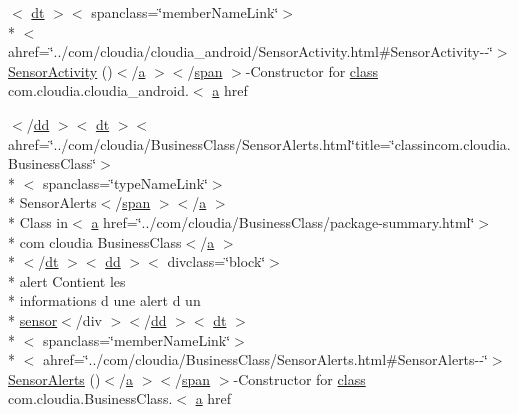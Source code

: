 \begin{DoxyCompactItemize}
$<$ \hyperlink{stylesheet_8css_a107565fb4039d33b041380d6e0ea1d80}{dt} $>$$<$ spanclass=\char`\"{}member\-Name\-Link\char`\"{}$>$\\*
$<$ ahref=\char`\"{}../com/cloudia/cloudia\-\_\-android/Sensor\-Activity.\-html\#Sensor\-Activity-\/-\/\char`\"{}$>$ \hyperlink{index-17_8html_a97696518ed3fb5905076e7d8a3e64b5a}{Sensor\-Activity} ()$<$/\hyperlink{style_8css_a5e8981582017bb8b84c21f148345d1f7}{a} $>$$<$/\hyperlink{stylesheet_8css_a8343996ebcf16220b04e54659aac31cc}{span} $>$-\/Constructor for \hyperlink{_tools_8html_acf06f836132665ba8114f5a414c2403f}{class} com.\-cloudia.\-cloudia\-\_\-android.$<$ \hyperlink{style_8css_a5e8981582017bb8b84c21f148345d1f7}{a} href
\item 
$<$/\hyperlink{stylesheet_8css_a47f4718a86835a7771ec592ece845221}{dd} $>$$<$ \hyperlink{stylesheet_8css_a107565fb4039d33b041380d6e0ea1d80}{dt} $>$$<$ ahref=\char`\"{}../com/cloudia/Business\-Class/Sensor\-Alerts.\-html\char`\"{}title=\char`\"{}classincom.\-cloudia.\-Business\-Class\char`\"{}$>$\\*
$<$ spanclass=\char`\"{}type\-Name\-Link\char`\"{}$>$\\*
 Sensor\-Alerts$<$/\hyperlink{stylesheet_8css_a8343996ebcf16220b04e54659aac31cc}{span} $>$$<$/\hyperlink{style_8css_a5e8981582017bb8b84c21f148345d1f7}{a} $>$\\*
 Class in$<$ \hyperlink{style_8css_a5e8981582017bb8b84c21f148345d1f7}{a} href=\char`\"{}../com/cloudia/Business\-Class/package-\/summary.\-html\char`\"{}$>$\\*
 com cloudia Business\-Class$<$/\hyperlink{style_8css_a5e8981582017bb8b84c21f148345d1f7}{a} $>$\\*
$<$/\hyperlink{stylesheet_8css_a107565fb4039d33b041380d6e0ea1d80}{dt} $>$$<$ \hyperlink{stylesheet_8css_a47f4718a86835a7771ec592ece845221}{dd} $>$$<$ divclass=\char`\"{}block\char`\"{}$>$\\*
 alert Contient les \\*
informations d une alert d un \\*
\hyperlink{index-17_8html_a473de8198e1708e7f705d9a565cff824}{sensor}$<$/div $>$$<$/\hyperlink{stylesheet_8css_a47f4718a86835a7771ec592ece845221}{dd} $>$$<$ \hyperlink{stylesheet_8css_a107565fb4039d33b041380d6e0ea1d80}{dt} $>$\\*
$<$ spanclass=\char`\"{}member\-Name\-Link\char`\"{}$>$\\*
$<$ ahref=\char`\"{}../com/cloudia/Business\-Class/Sensor\-Alerts.\-html\#Sensor\-Alerts-\/-\/\char`\"{}$>$ \hyperlink{index-17_8html_a809bd93b9f70ba416c4eacae353f4c76}{Sensor\-Alerts} ()$<$/\hyperlink{style_8css_a5e8981582017bb8b84c21f148345d1f7}{a} $>$$<$/\hyperlink{stylesheet_8css_a8343996ebcf16220b04e54659aac31cc}{span} $>$-\/Constructor for \hyperlink{_tools_8html_acf06f836132665ba8114f5a414c2403f}{class} com.\-cloudia.\-Business\-Class.$<$ \hyperlink{style_8css_a5e8981582017bb8b84c21f148345d1f7}{a} href

\end{DoxyCompactItemize}
